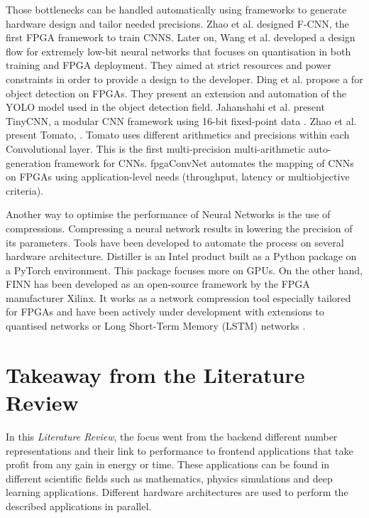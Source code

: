 Those bottlenecks can be handled automatically using frameworks to generate hardware design and tailor needed precisions. Zhao et al. \cite{Zhao2016} designed F-CNN, the first FPGA framework to train CNNS. Later on, Wang et al. \cite{Wang2018} developed a design flow for extremely low-bit neural networks that focuses on quantisation in both training and FPGA deployment. They aimed at strict resources and power constraints in order to provide a design to the developer. Ding et al. \cite{Ding2019} propose a  for object detection on FPGAs. They present an extension and automation of the YOLO model used in the object detection field. Jahanshahi et al. \cite{Jahanshahi2019} present TinyCNN, a modular CNN framework using 16-bit fixed-point data . Zhao et al. \cite{Zhao2019} present Tomato, . Tomato uses different arithmetics and precisions within each Convolutional layer. This is the first multi-precision multi-arithmetic auto-generation framework for CNNs. fpgaConvNet \cite{Venieris2017} automates the mapping of CNNs on FPGAs using application-level needs (throughput, latency or multiobjective criteria).

Another way to optimise the performance of Neural Networks is the use of compressions. Compressing a neural network results in lowering the precision of its parameters. Tools have been developed to automate the process on several hardware architecture. Distiller is an Intel product built as a Python package on a PyTorch environment. This package focuses more on GPUs. On the other hand, FINN \cite{Umuroglu2017} has been developed as an open-source framework by the FPGA manufacturer Xilinx. It works as a network compression tool especially tailored for FPGAs and have been actively under development with extensions to quantised networks \cite{Blott2018} or Long Short-Term Memory (LSTM) networks \cite{Rybalkin2018}.


\section{Takeaway from the Literature Review}
In this \emph{Literature Review}, the focus went from the backend different number representations and their link to performance to frontend applications that take profit from any gain in energy or time. These applications can be found in different scientific fields such as mathematics, physics simulations and deep learning applications. Different hardware architectures are used to perform the described applications in parallel.

